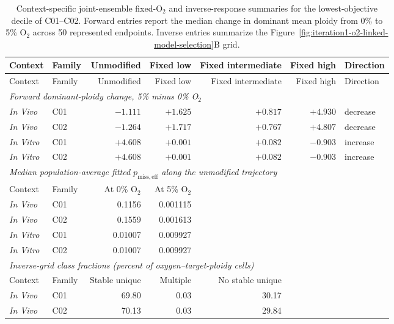 \begingroup
\scriptsize
\setlength{\tabcolsep}{2.8pt}
\renewcommand{\arraystretch}{0.92}
\begin{longtable}{@{}llrrrrp{}@{}}
\caption{Context-specific joint-ensemble fixed-O$_2$ and inverse-response summaries for the lowest-objective decile of C01--C02. Forward entries report the median change in dominant mean ploidy from 0\% to 5\% O$_2$ across 50 represented endpoints. Inverse entries summarize the Figure~\ref{fig:iteration1-o2-linked-model-selection}B grid.}\label{tab:joint_fixed_o2_summary}\\
\toprule
Context & Family & Unmodified & Fixed low & Fixed intermediate & Fixed high & Direction \\
\midrule
\endfirsthead
\toprule
Context & Family & Unmodified & Fixed low & Fixed intermediate & Fixed high & Direction \\
\midrule
\endhead
\multicolumn{7}{l}{\textit{Forward dominant-ploidy change, 5\% minus 0\% O$_2$}} \\
\textit{In Vivo} & C01 & $-1.111$ & $+1.625$ & $+0.817$ & $+4.930$ & decrease \\
\textit{In Vivo} & C02 & $-1.264$ & $+1.717$ & $+0.767$ & $+4.807$ & decrease \\
\textit{In Vitro} & C01 & $+4.608$ & $+0.001$ & $+0.082$ & $-0.903$ & increase \\
\textit{In Vitro} & C02 & $+4.608$ & $+0.001$ & $+0.082$ & $-0.903$ & increase \\
\midrule
\multicolumn{7}{l}{\textit{Median population-average fitted $p_{\mathrm{miss,eff}}$ along the unmodified trajectory}} \\
Context & Family & At 0\% O$_2$ & At 5\% O$_2$ & & & \\
\textit{In Vivo} & C01 & 0.1156 & 0.001115 & & & \\
\textit{In Vivo} & C02 & 0.1559 & 0.001613 & & & \\
\textit{In Vitro} & C01 & 0.01007 & 0.009927 & & & \\
\textit{In Vitro} & C02 & 0.01007 & 0.009927 & & & \\
\midrule
\multicolumn{7}{l}{\textit{Inverse-grid class fractions (percent of oxygen--target-ploidy cells)}} \\
Context & Family & Stable unique & Multiple & No stable unique & & \\
\textit{In Vivo} & C01 & 69.80 & 0.03 & 30.17 & & \\
\textit{In Vivo} & C02 & 70.13 & 0.03 & 29.84 & & \\

\end{longtable}
